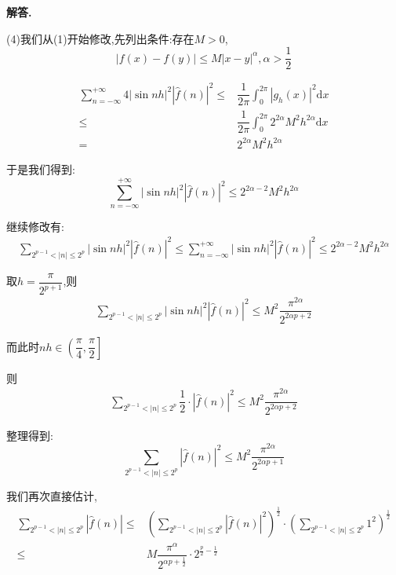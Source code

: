 \documentclass[12pt, a4paper, oneside]{ctexart}
\newenvironment{solution}{\par\noindent\textbf{解答. }}{\par}
\begin{document}
\begin{solution}
\par
(4)我们从(1)开始修改,先列出条件:存在$M>0$,
$$
|f(x)-f(y)|\leqslant M|x-y|^{\alpha}, \alpha>\dfrac{1}{2}
$$
\par
$$
\begin{aligned}
\sum_{n=-\infty}^{+\infty}
4\left|\sin nh\right|^2\left|\hat{f}(n)\right|^2
\leqslant &\dfrac{1}{2\pi}\int_{0}^{2\pi}\left|g_h(x)\right|^2\mathrm{d}x\\
\leqslant &\dfrac{1}{2\pi}\int_{0}^{2\pi}2^{2\alpha}M^2h^{2\alpha}\mathrm{d}x\\
= &2^{2\alpha}M^2h^{2\alpha}
\end{aligned}
$$
\par
于是我们得到:
$$
\sum_{n=-\infty}^{+\infty}
\left|\sin nh\right|^2\left|\hat{f}(n)\right|^2
\leqslant 2^{2\alpha-2}M^2h^{2\alpha}
$$
\par
继续修改有:
$$
\begin{aligned}
\sum_{2^{p-1}<|n|\leqslant 2^p}|\sin nh|^2\left|\hat{f}(n)\right|^2
\leqslant
\sum_{n=-\infty}^{+\infty}
\left|\sin nh\right|^2\left|\hat{f}(n)\right|^2
\leqslant  2^{2\alpha-2}M^2h^{2\alpha}
\end{aligned}
$$
\par
取$h=\dfrac{\pi}{2^{p+1}}$,则
$$
\begin{aligned}
    \sum_{2^{p-1}<|n|\leqslant 2^p}|\sin nh|^2\left|\hat{f}(n)\right|^2
    \leqslant  M^2\dfrac{\pi^{2\alpha}}{2^{2\alpha p+2}}   
    \end{aligned}
$$
\par
而此时$nh \in \left(\dfrac{\pi}{4},\dfrac{\pi}{2}\right]$
\par
则
$$
\begin{aligned}
    \sum_{2^{p-1}<|n|\leqslant 2^p}\dfrac{1}{2}\cdot\left|\hat{f}(n)\right|^2
    \leqslant  M^2\dfrac{\pi^{2\alpha}}{2^{2\alpha p+2}}
    \end{aligned}
$$
\par
整理得到:
$$
\sum_{2^{p-1}<|n|\leqslant 2^p}\left|\hat{f}(n)\right|^2
    \leqslant  M^2\dfrac{\pi^{2\alpha}}{2^{2\alpha p+1}}
$$
\par
我们再次直接估计,
$$
\begin{aligned}
\sum_{2^{p-1}<|n|\leqslant 2^p}\left|\hat{f}(n)\right|
    \leqslant & \left(\sum_{2^{p-1}<|n|\leqslant 
    2^p}\left|\hat{f}(n)\right|^2\right)^{\frac{1}{2}}
    \cdot \left(\sum_{2^{p-1}<|n|\leqslant 2^p}1^2\right)^{\frac{1}{2}}\\
    \leqslant & M\dfrac{\pi^{\alpha}}{2^{\alpha p+\frac{1}{2}}}\cdot 2^{\frac{p}{2}-\frac{1}{2}}\\

\end{aligned}$$
\end{solution}
\end{document}
